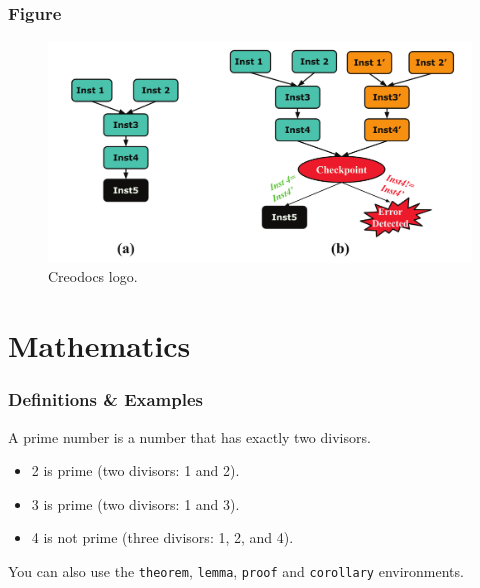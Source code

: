 \documentclass[
	12pt, %
]{beamer}
\begin{document}
\begin{frame}
	\frametitle{Figure}
	
	\begin{figure}
		\includegraphics[width=1\linewidth]{img1.png}
		\caption{Creodocs logo.}
	\end{figure}
\end{frame}


\section{Mathematics}

\begin{frame}
	\frametitle{Definitions \& Examples}
	
	\begin{definition}
		A \alert{prime number} is a number that has exactly two divisors.
	\end{definition}
	
	\smallskip %
	
	\begin{example}
		\begin{itemize}
			\item 2 is prime (two divisors: 1 and 2).
			\item 3 is prime (two divisors: 1 and 3).
			\item 4 is not prime (\alert{three} divisors: 1, 2, and 4).
		\end{itemize}
	\end{example}
	
	\smallskip %
	
	You can also use the \texttt{theorem}, \texttt{lemma}, \texttt{proof} and \texttt{corollary} environments.
\end{frame}
\end{document}
